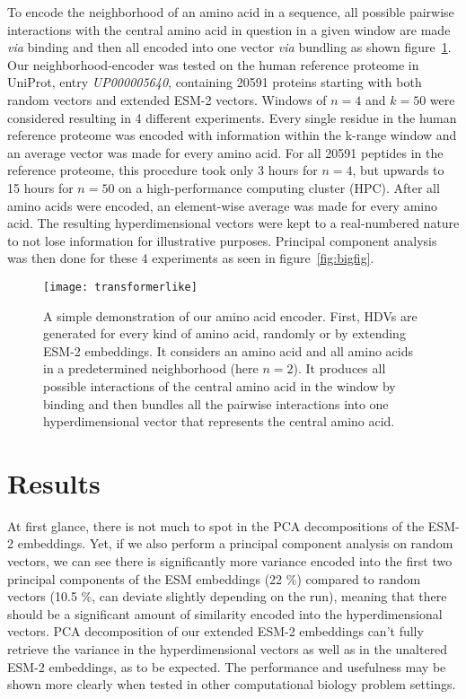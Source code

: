 To encode the neighborhood of an amino acid in a sequence, all possible pairwise interactions with the central amino acid in question in a given window are made \textit{via} binding and then all encoded into one vector \textit{via} bundling as shown figure~\ref{fig:AAtr}. Our neighborhood-encoder was tested on the human reference proteome in UniProt, entry \textit{UP000005640}, containing 20591 proteins starting with both random vectors and extended ESM-2 vectors. Windows of $n = 4$ and $k = 50$ were considered resulting in 4 different experiments. Every single residue in the human reference proteome was encoded with information within the k-range window and an average vector was made for every amino acid. For all 20591 peptides in the reference proteome, this procedure took only 3 hours for $n = 4$, but upwards to 15 hours for $n = 50$ on a high-performance computing cluster (HPC). After all amino acids were encoded, an element-wise average was made for every amino acid. The resulting hyperdimensional vectors were kept to a real-numbered nature to not lose information for illustrative purposes. Principal component analysis was then done for these 4 experiments as seen in figure~\ref{fig:bigfig}. 

\begin{figure}[H]
    \centering
    \texttt{[image: transformerlike]}
    \caption{A simple demonstration of our amino acid encoder. First, HDVs are generated for every kind of amino acid, randomly or by extending ESM-2 embeddings. It considers an amino acid and all amino acids in a predetermined neighborhood (here $n = 2$). It produces all possible interactions of the central amino acid in the window by binding and then bundles all the pairwise interactions into one hyperdimensional vector that represents the central amino acid.}
    \label{fig:AAtr}
\end{figure}


\section{Results}
At first glance, there is not much to spot in the PCA decompositions of the ESM-2 embeddings. Yet, if we also perform a principal component analysis on random vectors, we can see there is significantly more variance encoded into the first two principal components of the ESM embeddings (22 \%) compared to random vectors (10.5 \%, can deviate slightly depending on the run), meaning that there should be a significant amount of similarity encoded into the hyperdimensional vectors. PCA decomposition of our extended ESM-2 embeddings can't fully retrieve the variance in the hyperdimensional vectors as well as in the unaltered ESM-2 embeddings, as to be expected. The performance and usefulness may be shown more clearly when tested in other computational biology problem settings.

